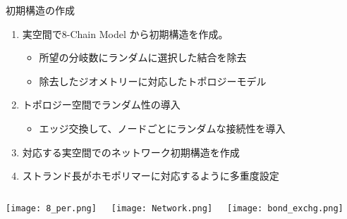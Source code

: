 \begin{columns}[totalwidth=.85\linewidth]
    \column{\textwidth}
    \vspace{-10mm}
        \begin{itembox}[l]{初期構造の作成\cite{sasaki}}
            \begin{enumerate}
                \item \alert{実空間}で8-Chain Model から初期構造を作成。
                    \begin{itemize}
                        \normalsize
                        \item 所望の分岐数に\alert{ランダム}に選択した\alert{結合を除去}
                        \item 除去したジオメトリーに対応した\alert{トポロジーモデル}
                    \end{itemize}
                \item トポロジー空間でランダム性の導入
                    \begin{itemize}
                        \normalsize
                        \item \alert{エッジ交換}して、ノードごとにランダムな接続性を導入
                    \end{itemize}	
                \item 対応する\alert{実空間でのネットワーク初期構造}を作成
                \item \alert{ストランド長がホモポリマーに対応}するように多重度設定
            \end{enumerate}

            \vspace{-1mm}
            \begin{columns}[T, onlytextwidth]
                    \texttt{[image: 8\_per.png]}
                    \vspace{-5mm}
                    \begin{center}
                        \texttt{[image: Network.png]}
                    \end{center}
                    \texttt{[image: bond\_exchg.png]}
            \end{columns}
        \end{itembox}


\end{columns}
